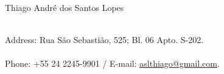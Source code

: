 {
  \noindent\LARGE{Thiago André dos Santos Lopes}
  \vspace{0.5em}
}

\begin{normalsize}
  \\
  Address: Rua São Sebastião, 525; Bl. 06 Apto. S-202.\\
  \\
  Phone: +55 24 2245-9901 / E-mail:
    \underline{\href{mailto:aslthiago@gmail.com}{aslthiago@gmail.com}}.
\end{normalsize}
